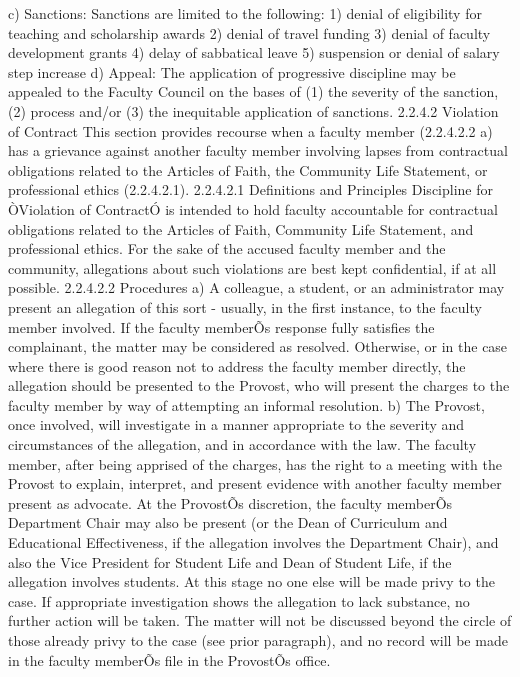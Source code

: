 \documentclass[letterpaper, 11pt]{article}
\begin{document}
	c) Sanctions:
	Sanctions are limited to the following:
	1) denial of eligibility for teaching and scholarship awards
	2) denial of travel funding
	3) denial of faculty development grants
	4) delay of sabbatical leave
	5) suspension or denial of salary step increase
	d) Appeal:
	The application of progressive discipline may be appealed to the Faculty Council on the bases of (1) the severity of the sanction, (2) process and/or (3) the inequitable application of sanctions.
	2.2.4.2 Violation of Contract
	This section provides recourse when a faculty member (2.2.4.2.2 a) has a grievance against another faculty member involving lapses from contractual obligations related to the Articles of Faith, the Community Life Statement, or professional ethics (2.2.4.2.1).
	2.2.4.2.1 Definitions and Principles
	Discipline for ÒViolation of ContractÓ is intended to hold faculty accountable for contractual obligations related to the Articles of Faith, Community Life Statement, and professional ethics.  For the sake of the accused faculty member and the community, allegations about such violations are best kept confidential, if at all possible.
	2.2.4.2.2 Procedures
	a) A colleague, a student, or an administrator may present an allegation of this sort - usually, in the first instance, to the faculty member involved.  If the faculty memberÕs response fully satisfies the complainant, the matter may be considered as resolved.  Otherwise, or in the case where there is good reason not to address the faculty member directly, the allegation should be presented to the Provost, who will present the charges to the faculty member by way of attempting an informal resolution.
	b) The Provost, once involved, will investigate in a manner appropriate to the severity and circumstances of the allegation, and in accordance with the law.  The faculty member, after being apprised of the charges, has the right to a meeting with the Provost to explain, interpret, and present evidence with another faculty member present as advocate.  At the ProvostÕs discretion, the faculty memberÕs Department Chair may also be present (or the Dean of Curriculum and Educational Effectiveness, if the allegation involves the Department Chair), and also the Vice President for Student Life and Dean of Student Life, if the allegation involves students.  At this stage no one else will be made privy to the case.
	If appropriate investigation shows the allegation to lack substance, no further action will be taken.  The matter will not be discussed beyond the circle of those already privy to the case (see prior paragraph), and no record will be made in the faculty memberÕs file in the ProvostÕs office.
\end{document}
